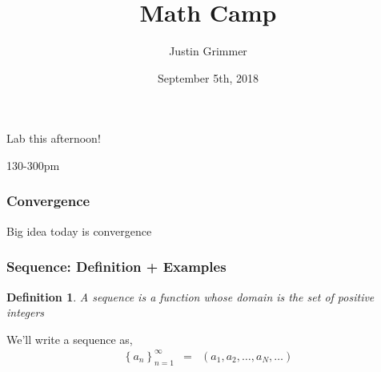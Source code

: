 \documentclass{beamer}
\title[Methodology I] %
{Math Camp}
\author{Justin Grimmer}
\institute[Stanford University]{Professor\\Department of Political Science \\  Stanford University}
\date{September 5th, 2018}
\newtheorem{defn}{Definition}
\numberwithin{equation}{section}
\begin{document}
\begin{frame}
\titlepage
\end{frame}


\begin{frame}

{\huge Lab this afternoon!\\

\vspace{0.25in}

130-300pm}


\end{frame}




\begin{frame}
\frametitle{Convergence}

Big idea today is \alert{convergence} \pause 

\begin{itemize}
 \pause 
{} \pause 
{} \pause 
{}
\end{itemize}

\end{frame}


\begin{frame}
\frametitle{Sequence: Definition + Examples}

\begin{defn}
A \alert{sequence} is a function whose domain is the set of positive integers
\end{defn}

We'll write a sequence as, 
\begin{eqnarray}
\left\{a_{n} \right\}_{n=1}^{\infty} & =& (a_{1} , a_{2}, \hdots, a_{N}, \hdots ) \nonumber 
\end{eqnarray}



\end{frame}
\end{document}

